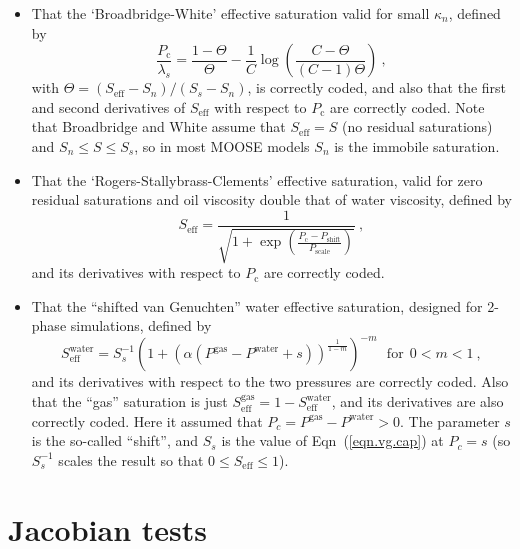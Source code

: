 \documentclass[]{scrreprt}
\begin{document}
\begin{itemize}
\item That the `Broadbridge-White' effective saturation valid for
  small $\kappa_{n}$, defined by
\begin{equation}
\frac{P_{\mathrm{c}}}{\lambda_{s}} = \frac{1-\Theta}{\Theta} - \frac{1}{C}\log
\left( \frac{C-\Theta}{(C-1)\Theta} \right) \ ,
\end{equation}
with $\Theta = (S_{\mathrm{eff}} - S_{n})/(S_{s}-S_{n})$, 
is correctly coded, and also that the first and second derivatives of
$S_{\mathrm{eff}}$ with respect to $P_{\mathrm{c}}$ are correctly
coded.  Note that Broadbridge and White assume that
$S_{\mathrm{eff}}=S$ (no residual saturations) and $S_{n}\leq S \leq
S_{s}$, so in most MOOSE models $S_{n}$ is the immobile saturation.

\item That the `Rogers-Stallybrass-Clements' effective saturation,
  valid for zero residual saturations and oil viscosity double that of
  water viscosity, defined by
\begin{equation}
S_{\mathrm{eff}} = \frac{1}{\sqrt{1 +
    \exp\left(\frac{P_{\mathrm{c}}-P_{\mathrm{shift}}}{P_{\mathrm{scale}}}\right)}}
\ ,
\end{equation}
and its derivatives with respect to $P_{\mathrm{c}}$ are correctly coded.

\item That the ``shifted van Genuchten'' water effective saturation,
  designed for 2-phase simulations, defined by
\begin{equation}
S^{\mathrm{water}}_{\mathrm{eff}} = S_{s}^{-1}\left( 1 + (\alpha
  (P^{\mathrm{gas}} - P^{\mathrm{water}} + s))^{\frac{1}{1 - m}}
\right)^{-m} \ \ \ \mbox{for}\ \ 0<m<1 \ ,
\end{equation}
and its derivatives with respect to the two pressures are correctly
coded.  Also that the ``gas'' saturation is just
$S^{\mathrm{gas}}_{\mathrm{eff}}=1-S^{\mathrm{water}}_{\mathrm{eff}}$,
and its derivatives are also correctly coded.
Here it assumed that $P_{c} = P^{\mathrm{gas}}-P^{\mathrm{water}}>0$.
The parameter $s$ is the so-called ``shift'', and $S_{s}$ is the value of
Eqn~(\ref{eqn.vg.cap}) at $P_{c}=s$ (so $S_{s}^{-1}$ scales the result so
that $0\leq S_{\mathrm{eff}}\leq 1$).

\end{itemize}



\chapter{Jacobian tests}
\label{jac}
\end{document}
